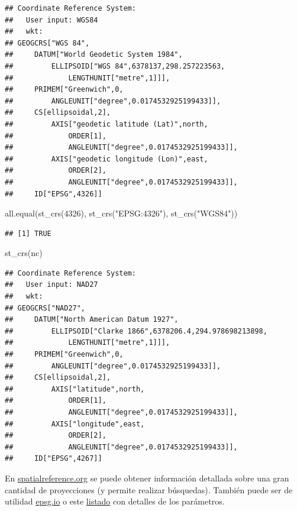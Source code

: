 \documentclass[
  spanish,
]{book}
\newenvironment{Shaded}{\begin{snugshade}}{\end{snugshade}}
\newcommand{\DecValTok}[1]{\textcolor[rgb]{0.00,0.00,0.81}{#1}}
\newcommand{\FunctionTok}[1]{\textcolor[rgb]{0.00,0.00,0.00}{#1}}
\newcommand{\NormalTok}[1]{#1}
\newcommand{\StringTok}[1]{\textcolor[rgb]{0.31,0.60,0.02}{#1}}
\theoremstyle{break}
\theoremstyle{definition}
\theoremstyle{definition}
\theoremstyle{definition}
\theoremstyle{definition}
\theoremstyle{remark}
\begin{document}
\begin{verbatim}
## Coordinate Reference System:
##   User input: WGS84 
##   wkt:
## GEOGCRS["WGS 84",
##     DATUM["World Geodetic System 1984",
##         ELLIPSOID["WGS 84",6378137,298.257223563,
##             LENGTHUNIT["metre",1]]],
##     PRIMEM["Greenwich",0,
##         ANGLEUNIT["degree",0.0174532925199433]],
##     CS[ellipsoidal,2],
##         AXIS["geodetic latitude (Lat)",north,
##             ORDER[1],
##             ANGLEUNIT["degree",0.0174532925199433]],
##         AXIS["geodetic longitude (Lon)",east,
##             ORDER[2],
##             ANGLEUNIT["degree",0.0174532925199433]],
##     ID["EPSG",4326]]
\end{verbatim}

\begin{Shaded}
\begin{Highlighting}[]
\FunctionTok{all.equal}\NormalTok{(}\FunctionTok{st\_crs}\NormalTok{(}\DecValTok{4326}\NormalTok{), }\FunctionTok{st\_crs}\NormalTok{(}\StringTok{"EPSG:4326"}\NormalTok{), }\FunctionTok{st\_crs}\NormalTok{(}\StringTok{"WGS84"}\NormalTok{))}
\end{Highlighting}
\end{Shaded}

\begin{verbatim}
## [1] TRUE
\end{verbatim}

\begin{Shaded}
\begin{Highlighting}[]
\FunctionTok{st\_crs}\NormalTok{(nc)}
\end{Highlighting}
\end{Shaded}

\begin{verbatim}
## Coordinate Reference System:
##   User input: NAD27 
##   wkt:
## GEOGCRS["NAD27",
##     DATUM["North American Datum 1927",
##         ELLIPSOID["Clarke 1866",6378206.4,294.978698213898,
##             LENGTHUNIT["metre",1]]],
##     PRIMEM["Greenwich",0,
##         ANGLEUNIT["degree",0.0174532925199433]],
##     CS[ellipsoidal,2],
##         AXIS["latitude",north,
##             ORDER[1],
##             ANGLEUNIT["degree",0.0174532925199433]],
##         AXIS["longitude",east,
##             ORDER[2],
##             ANGLEUNIT["degree",0.0174532925199433]],
##     ID["EPSG",4267]]
\end{verbatim}

En \href{https://spatialreference.org}{spatialreference.org} se puede obtener información detallada sobre una gran cantidad de proyecciones (y permite realizar búsquedas).
También puede ser de utilidad \href{https://epsg.io}{epsg.io} o este \href{https://proj.org/operations/projections}{listado} con detalles de los parámetros.
\end{document}
